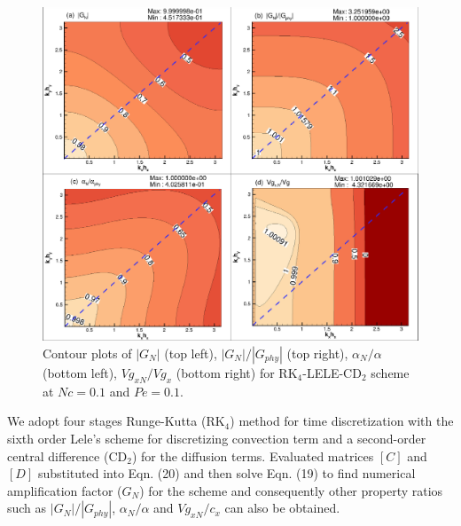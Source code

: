 \documentclass[showpacs,preprintnumbers,amsmath,amssymb]{revtex4-1} %
\begin{document}
\begin{figure}[h]
\begin{center}
\includegraphics[width=150mm]{RK4_LELE_CD2_cont.pdf}
\end{center}
\raggedleft
\caption{Contour plots of $|G_N|$ (top left), $|G_N|/|G_{phy}|$ (top right), $\alpha_N/\alpha$ (bottom left), $Vg_{xN}/Vg_x$ (bottom right) for RK$_4$-LELE-CD$_2$ scheme at $Nc=0.1$ and $Pe=0.1$.}
\label{fig_lele}
\end{figure}

We adopt four stages Runge-Kutta (RK$_4$) method for time discretization with the sixth order Lele's scheme for discretizing convection term and a second-order central difference (CD$_2$) for the diffusion terms. Evaluated matrices $[C]$ and $[D]$ substituted into Eqn. (20) and then solve Eqn. (19) to find numerical amplification factor ($G_N$) for the scheme and consequently other property ratios such as $|G_N|/|G_{phy}|$, $\alpha_N/\alpha$ and $Vg_{xN}/c_x$ can also be obtained.
\end{document}
